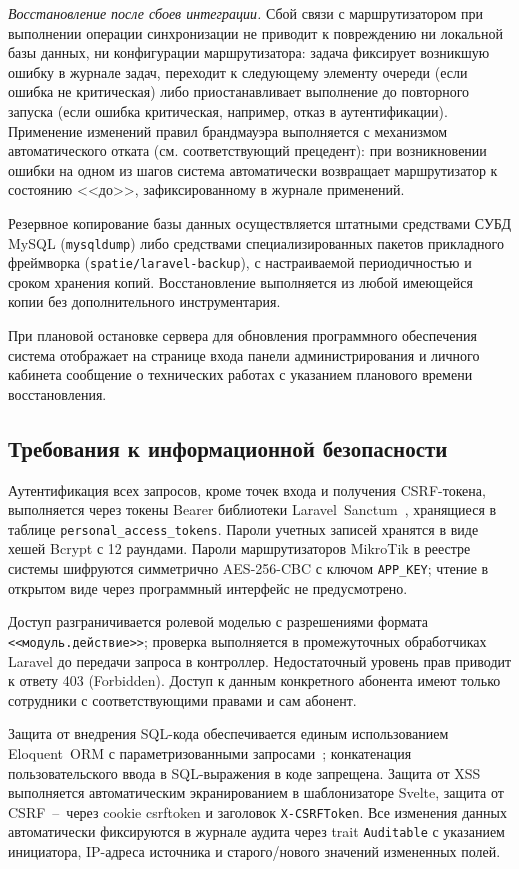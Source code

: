 \emph{Восстановление после сбоев интеграции.} Сбой связи с маршрутизатором при выполнении операции синхронизации не приводит к повреждению ни локальной базы данных, ни конфигурации маршрутизатора: задача фиксирует возникшую ошибку в журнале задач, переходит к следующему элементу очереди (если ошибка не критическая) либо приостанавливает выполнение до повторного запуска (если ошибка критическая, например, отказ в аутентификации). Применение изменений правил брандмауэра выполняется с механизмом автоматического отката (см. соответствующий прецедент): при возникновении ошибки на одном из шагов система автоматически возвращает маршрутизатор к состоянию <<до>>, зафиксированному в журнале применений.

Резервное копирование базы данных осуществляется штатными средствами СУБД MySQL (\texttt{mysqldump}) либо средствами специализированных пакетов прикладного фреймворка (\texttt{spatie/laravel-backup}), с настраиваемой периодичностью и сроком хранения копий. Восстановление выполняется из любой имеющейся копии без дополнительного инструментария.

При плановой остановке сервера для обновления программного обеспечения система отображает на странице входа панели администрирования и личного кабинета сообщение о технических работах с указанием планового времени восстановления.

\subsection{Требования к информационной безопасности}

Аутентификация всех запросов, кроме точек входа и получения CSRF-токена, выполняется через токены Bearer библиотеки Laravel~Sanctum~\cite{sanctum}, хранящиеся в таблице \texttt{personal\_access\_tokens}. Пароли учетных записей хранятся в виде хешей Bcrypt с 12 раундами. Пароли маршрутизаторов MikroTik в реестре системы шифруются симметрично AES-256-CBC с ключом \texttt{APP\_KEY}; чтение в открытом виде через программный интерфейс не предусмотрено.

Доступ разграничивается ролевой моделью с разрешениями формата \texttt{<<модуль.действие>>}; проверка выполняется в промежуточных обработчиках Laravel до передачи запроса в контроллер. Недостаточный уровень прав приводит к ответу 403 (Forbidden). Доступ к данным конкретного абонента имеют только сотрудники с соответствующими правами и сам абонент.

Защита от внедрения SQL-кода обеспечивается единым использованием Eloquent~ORM с параметризованными запросами~\cite{owasp}; конкатенация пользовательского ввода в SQL-выражения в коде запрещена. Защита от XSS выполняется автоматическим экранированием в шаблонизаторе Svelte, защита от CSRF~--~через cookie csrftoken и заголовок \texttt{X-CSRFToken}. Все изменения данных автоматически фиксируются в журнале аудита через trait \texttt{Auditable} с указанием инициатора, IP-адреса источника и старого/нового значений измененных полей.

